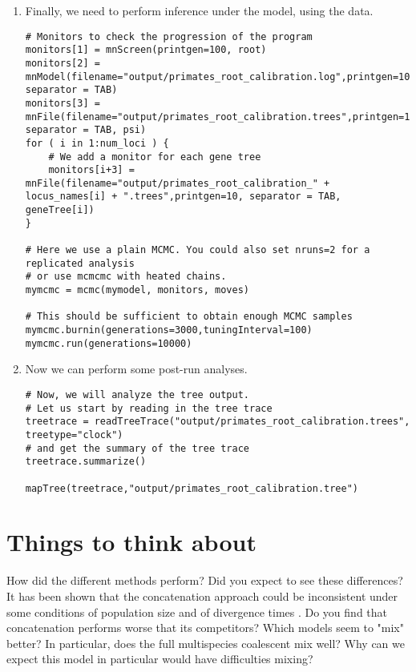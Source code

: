 \begin{enumerate}
\item Finally, we need to perform inference under the model, using the data.
{\tt \begin{snugshade*}
\begin{lstlisting}
# Monitors to check the progression of the program
monitors[1] = mnScreen(printgen=100, root)
monitors[2] = mnModel(filename="output/primates_root_calibration.log",printgen=10, separator = TAB)
monitors[3] = mnFile(filename="output/primates_root_calibration.trees",printgen=10, separator = TAB, psi)
for ( i in 1:num_loci ) { 
    # We add a monitor for each gene tree
    monitors[i+3] = mnFile(filename="output/primates_root_calibration_" + locus_names[i] + ".trees",printgen=10, separator = TAB, geneTree[i])
}

# Here we use a plain MCMC. You could also set nruns=2 for a replicated analysis
# or use mcmcmc with heated chains.
mymcmc = mcmc(mymodel, monitors, moves)

# This should be sufficient to obtain enough MCMC samples
mymcmc.burnin(generations=3000,tuningInterval=100)
mymcmc.run(generations=10000)
\end{lstlisting}
\end{snugshade*}}

\item Now we can perform some post-run analyses.
{\tt \begin{snugshade*}
\begin{lstlisting}
# Now, we will analyze the tree output.
# Let us start by reading in the tree trace
treetrace = readTreeTrace("output/primates_root_calibration.trees", treetype="clock")
# and get the summary of the tree trace
treetrace.summarize()

mapTree(treetrace,"output/primates_root_calibration.tree")
\end{lstlisting}
\end{snugshade*}}

\end{enumerate}



\section{Things to think about}
How did the different methods perform? 
Did you expect to see these differences?
It has been shown that the concatenation approach could be inconsistent under some conditions of population size and of divergence times \citep{Degnan2006}. 
Do you find that concatenation performs worse that its competitors?
Which models seem to "mix" better?
In particular, does the full multispecies coalescent mix well?
Why can we expect this model in particular would have difficulties mixing?





